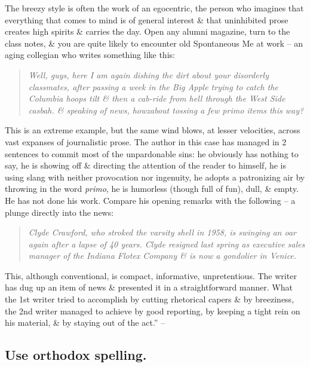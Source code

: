 \documentclass{article}
\numberwithin{equation}{section}
\begin{document}
The breezy style is often the work of an egocentric, the person who imagines that everything that comes to mind is of general interest \& that uninhibited prose creates high spirits \& carries the day. Open any alumni magazine, turn to the class notes, \& you are quite likely to encounter old Spontaneous Me at work -- an aging collegian who writes something like this:
\begin{quotation}\it
	Well, guys, here I am again dishing the dirt about your disorderly classmates, after passing a week in the Big Apple trying to catch the Columbia hoops tilt \& then a cab-ride from hell through the West Side casbah. \& speaking of news, howzabout tossing a few primo items this way?
\end{quotation}
This is an extreme example, but the same wind blows, at lesser velocities, across vast expanses of journalistic prose. The author in this case has managed in 2 sentences to commit most of the unpardonable sins: he obviously has nothing to say, he is showing off \& directing the attention of the reader to himself, he is using slang with neither provocation nor ingenuity, he adopts a patronizing air by throwing in the word \textit{primo}, he is humorless (though full of fun), dull, \& empty. He has not done his work. Compare his opening remarks with the following -- a plunge directly into the news:
\begin{quotation}\it
	Clyde Crawford, who stroked the varsity shell in 1958, is swinging an oar again after a lapse of 40 years. Clyde resigned last spring as executive sales manager of the Indiana Flotex Company \& is now a gondolier in Venice.
\end{quotation}
This, although conventional, is compact, informative, unpretentious. The writer has dug up an item of news \& presented it in a straightforward manner. What the 1st writer tried to accomplish by cutting rhetorical capers \& by breeziness, the 2nd writer managed to achieve by good reporting, by keeping a tight rein on his material, \& by staying out of the act.'' -- \cite[p. 87]{Strunk_White2019}


\subsection{Use orthodox spelling.}

\end{document}
